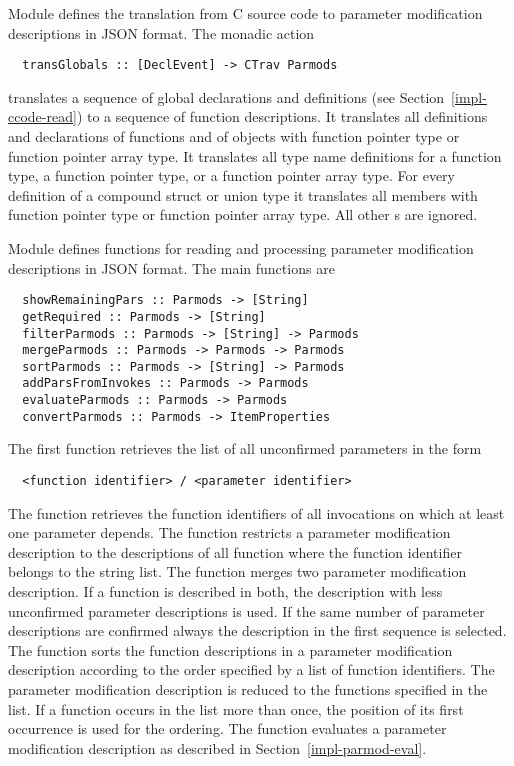 Module  defines the translation from C source code to parameter modification descriptions
in JSON format. The monadic action
\begin{verbatim}
  transGlobals :: [DeclEvent] -> CTrav Parmods
\end{verbatim}
translates a sequence of global declarations and definitions (see Section~\ref{impl-ccode-read}) to a sequence of
function descriptions. It translates all definitions and declarations of functions and of objects with function pointer
type or function pointer array type. It translates all type name definitions for a function type, a function pointer type, 
or a function pointer array type.
For every definition of a compound struct or union type it translates all members with function pointer type or function 
pointer array type.
All other s are ignored.

Module  defines functions for reading and processing parameter modification descriptions in JSON format.
The main functions are 
\begin{verbatim}
  showRemainingPars :: Parmods -> [String]
  getRequired :: Parmods -> [String]
  filterParmods :: Parmods -> [String] -> Parmods
  mergeParmods :: Parmods -> Parmods -> Parmods
  sortParmods :: Parmods -> [String] -> Parmods
  addParsFromInvokes :: Parmods -> Parmods
  evaluateParmods :: Parmods -> Parmods
  convertParmods :: Parmods -> ItemProperties
\end{verbatim}
The first function retrieves the list of all unconfirmed parameters in the form
\begin{verbatim}
  <function identifier> / <parameter identifier>
\end{verbatim}
The function  retrieves the function identifiers of all invocations on which at least one parameter depends.
The function  restricts a parameter modification description to the descriptions of all function
where the function identifier belongs to the string list. 
The function  merges two parameter modification description. If a function is described in both, the description
with less unconfirmed parameter descriptions is used. If the same number of parameter descriptions are confirmed 
always the description in the first sequence is selected. The function  sorts the function descriptions
in a parameter modification description according to the order specified by a list of function identifiers. The parameter
modification description is reduced to the functions specified in the list. If a function occurs in the list more than once, 
the position of its first occurrence is used for the ordering.
The function  evaluates a parameter modification description as described in 
Section~\ref{impl-parmod-eval}. 

